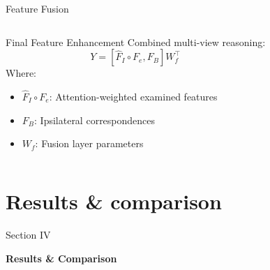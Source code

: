 \documentclass[8pt,aspectratio=169,xcolor=dvipsnames]{beamer}
\begin{document}
\begin{frame}{Feature Fusion}
\begin{columns}
        \begin{block}{Final Feature Enhancement}
        Combined multi-view reasoning:
        \[
        Y = [\hat{F}_I \circ F_e, F_B] W_f^\top
        \]
        Where:
        \begin{itemize}
            \item $\hat{F}_I \circ F_e$: Attention-weighted examined features
            \item $F_B$: Ipsilateral correspondences
            \item $W_f$: Fusion layer parameters
        \end{itemize}
        \end{block}
    \end{columns}
\end{frame}


\section{Results \& comparison}

{
\begin{frame}[plain]

    \vfill
    \begin{center}
    {\color{white}\large Section IV}

    \vspace{1cm}

    {\color{white}\bfseries\fontsize{28}{34}\selectfont Results \& Comparison}
    \end{center}
    \vfill

\end{frame}
}
\end{document}
